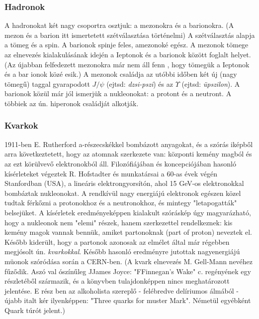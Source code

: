\documentclass[../main.tex]{subfiles}
\begin{document}
\subsubsection{Hadronok}
A hadronokat két nagy csoportra osztjuk: a mezonokra és a barionokra.
(A mezon és a barion itt ismertetett szétválasztása történelmi) A szétválasztás alapja a tömeg és a spin. A barionok spinje feles, amezonoké egész.
A mezonok tömege az elnevezés kialakulásának idején a Ieptonok és a barionok között foglalt helyet. (Az újabban felfedezett mezonokra már nem áll
fenn , hogy tömegük a Ieptonok és a bar ionok közé esik.) A mezonok családja az utóbbi időben két új (nagy tömegű) taggal gyarapodott $J/\psi$ (ejtsd:
\textit{dzsi-pszi}) és az $\Upsilon$ (ejtsd: \textit{üpszilon}).
A barionok közül már jól ismerjük a nukleonokat: a protont és a neutront. A többiek az ún. hiperonok családját alkotják.

\subsubsection{Kvarkok}
1911-ben E. Rutherford a-részecskékkel bombázott anyagokat, és a szórás iképből arra következtetett, hogy az atomnak szerkezete van: központi kemény magból és az ezt körülvevő elektronokból áll. Filozófiájában és koncepciójában hasonló kísérleteket végeztek R. Hofstadter és munkatársai a 60-as
évek végén Stanfordban (USA), a lineáris elektrongyorsítón, ahol 15 GeV-os elektronokkal bombáztak nukleonokat. A rendkívül nagy energiájú elektronok egészen közel tudtak férkőzni a protonokhoz és a neutronokhoz, és
mintegy "letapogatták" belsejüket. A kísérletek eredményeképpen kialakult
szóráskép úgy magyarázható, hogy a nukleonok nem "elemi" részek, hanem szerkezettel rendelkeznek: kis kemény magok vannak bennük, amiket
partonoknak (part of proton) neveztek el. Később kiderült, hogy a partonok azonosak az elmélet által már régebben megjósolt ún. \textit{kvarkokkal}.
Később hasonló eredményre jutottak nagyenergiájú müonok szóródása során a CERN-ben. (A kvark elnevezés M. Gell-Mann nevéhez fűződik. Aszó
val ószínűleg JJames Joyce: "FFinnegan's Wake" c. regényének egy részletéből
származik, és a könyvben tulajdonképpen nincs meghatározott jelentése.
E rész ben az alkoholista szereplő - felébredve delíriumos álmából - újabb
italt kér ilyenképpen: "Three quarks for muster Mark". Németül egyébként Quark túrót jelent.)
\end{document}

